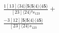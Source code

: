 \documentclass[varwidth, border=5pt]{standalone}
\begin{document}
\begin{my}
$\begin{gathered}
\scriptscriptstyle\frac{1[13]⟨34⟩[𝟓|𝟓|4⟩⟨4𝟓⟩}{[23]⟨24⟩²s_{123}} +\\
\scriptscriptstyle\frac{-3[12][𝟓|𝟓|4⟩⟨4𝟓⟩}{[23]⟨24⟩s_{123}} \phantom{+}
\end{gathered}$
\end{my}
\end{document}
